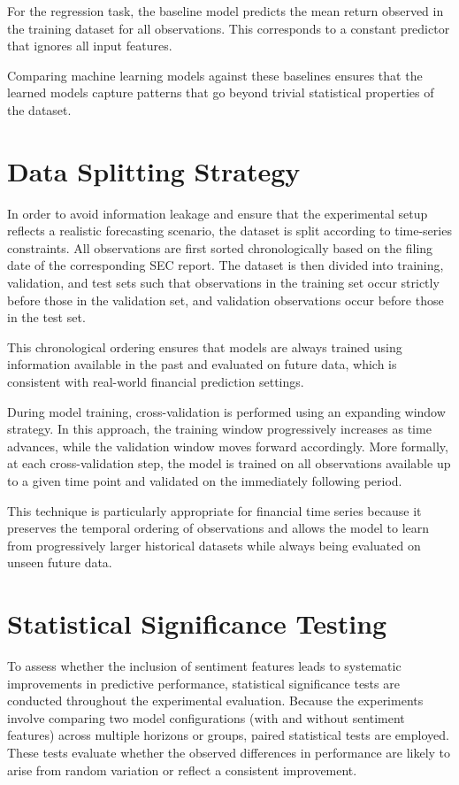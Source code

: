 For the regression task, the baseline model predicts the mean return observed in the training dataset for all observations. This corresponds to a constant predictor that ignores all input features.

Comparing machine learning models against these baselines ensures that the learned models capture patterns that go beyond trivial statistical properties of the dataset.

\section{Data Splitting Strategy}

In order to avoid information leakage and ensure that the experimental setup reflects a realistic forecasting scenario, the dataset is split according to time-series constraints. All observations are first sorted chronologically based on the filing date of the corresponding SEC report. The dataset is then divided into training, validation, and test sets such that observations in the training set occur strictly before those in the validation set, and validation observations occur before those in the test set.

This chronological ordering ensures that models are always trained using information available in the past and evaluated on future data, which is consistent with real-world financial prediction settings.

During model training, cross-validation is performed using an expanding window strategy. In this approach, the training window progressively increases as time advances, while the validation window moves forward accordingly. More formally, at each cross-validation step, the model is trained on all observations available up to a given time point and validated on the immediately following period.

This technique is particularly appropriate for financial time series because it preserves the temporal ordering of observations and allows the model to learn from progressively larger historical datasets while always being evaluated on unseen future data.

\section{Statistical Significance Testing}

To assess whether the inclusion of sentiment features leads to systematic improvements in predictive performance, statistical significance tests are conducted throughout the experimental evaluation. Because the experiments involve comparing two model configurations (with and without sentiment features) across multiple horizons or groups, paired statistical tests are employed. These tests evaluate whether the observed differences in performance are likely to arise from random variation or reflect a consistent improvement.

